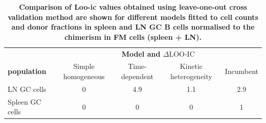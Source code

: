 \documentclass[11pt,onecolumn]{article}
\newcommand{\looic}{\ensuremath{\Delta \text{LOO-IC}}}
\begin{document}
\begin{table}[h!]
	\begin{center}
		\renewcommand{\arraystretch}{1.25}
		\begin{tabular}{ l c c c c} 
			\toprule 
			& \multicolumn{4}{c}{\textbf{Model and {\looic}}} \\
			\cline{2-5}
			\textbf{population}  &  {\small Simple homogeneous}   & {\small Time-dependent} &  {\small Kinetic heterogeneity} & {\small Incumbent}   \\ 
			\toprule
			LN GC cells         & 0   &  4.9  & 1.1 & 2.9   \\ 
			Spleen GC cells     & 0   &  0    & 0   & 1  \\ 			
			\hline
			\toprule 
		\end{tabular}
	\end{center}
	\caption{\small \textbf{Comparison of Loo-ic values obtained using leave-one-out cross validation method are shown for different models fitted to cell counts and donor fractions in spleen and LN GC B cells normalised to the chimerism in FM cells (spleen + LN).}} 
\label{tab:GC-AICs}
\end{table} 
\end{document}
